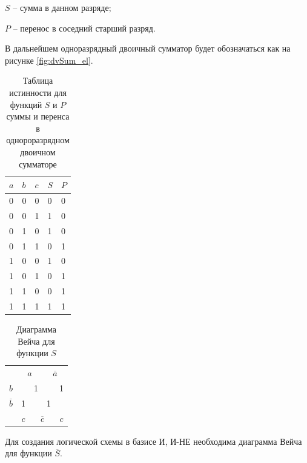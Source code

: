\documentclass[a4paper,14pt]{article}
\begin{document}
$S$ -- сумма в данном разряде;

$P$ -- перенос в соседний старший разряд.

В дальнейшем одноразрядный двоичный сумматор будет обозначаться как на рисунке \ref{fig:dvSum_el}.

\begin{table}[H]
\begin{center}
	\caption{\label{tab:dvSum} Таблица истинности для функций $S$ и $P$ суммы и перенса в однороразрядном двоичном сумматоре}
	\begin{tabular}{|l|l|l|l|l|}
		\hline
		$a$ & $b$ & $c$ & $S$ & $P$ \\ \hline
		0 & 0 & 0 & 0 & 0 \\ \hline
		0 & 0 & 1 & 1 & 0 \\ \hline
		0 & 1 & 0 & 1 & 0 \\ \hline
		0 & 1 & 1 & 0 & 1 \\ \hline
		1 & 0 & 0 & 1 & 0 \\ \hline
		1 & 0 & 1 & 0 & 1 \\ \hline
		1 & 1 & 0 & 0 & 1 \\ \hline
		1 & 1 & 1 & 1 & 1 \\ \hline
	\end{tabular}
\end{center}
\end{table}

\begin{table}[H]
	\begin{center}
		\caption{\label{tab:SDvSum} Диаграмма Вейча для функции $S$}
	\begin{tabular}{ccccc}
		& \multicolumn{2}{c}{$a$}                           & \multicolumn{2}{c}{$\overline{a}$}                          \\ \cline{2-5} 
		\multicolumn{1}{c|}{$b$}  & \multicolumn{1}{c|}{}  & \multicolumn{1}{c|}{1} & \multicolumn{1}{c|}{}  & \multicolumn{1}{c|}{1} \\ \cline{2-5} 
		\multicolumn{1}{c|}{$\overline{b}$} & \multicolumn{1}{c|}{1} & \multicolumn{1}{c|}{}  & \multicolumn{1}{c|}{1} & \multicolumn{1}{c|}{}  \\ \cline{2-5} 
		& $c$                     & \multicolumn{2}{c}{$\overline{c}$}                          & $c$                     
	\end{tabular}
\end{center}
\end{table}

Для создания логической схемы в базисе И, И-НЕ необходима диаграмма Вейча для функции $\overline{S}$.
\end{document}
